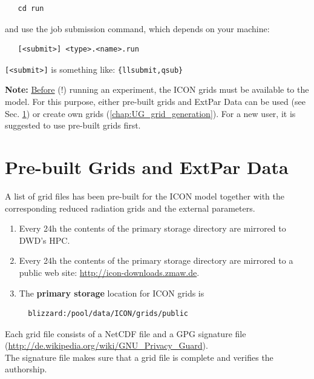 \begin{small}
  \begin{verbatim}
   cd run
  \end{verbatim}
\end{small}

and use the job submission command, which depends on your machine:

\begin{small}
  \begin{verbatim}
   [<submit>] <type>.<name>.run
  \end{verbatim}
\end{small} 

\verb+[<submit>]+ is something like: \verb+{llsubmit,qsub}+

\textbf{Note:} \underline{Before} (!) running an experiment, the ICON grids must be available to the model. For this purpose, either pre-built grids and ExtPar Data can be used (see Sec. \ref{chap:prebuilt_grid}) or create own grids (\ref{chap:UG_grid_generation}). For a new user, it is suggested to use pre-built grids first.

\section{Pre-built Grids and ExtPar Data}\label{chap:prebuilt_grid}
A list of grid files has been pre-built for the ICON model together with the corresponding reduced radiation grids and the external parameters.

\begin{enumerate}

\item Every 24h the contents of the primary storage directory are mirrored to DWD's HPC.
\item Every 24h the contents of the primary storage directory are mirrored to a public web site:
\href{http://icon-downloads.zmaw.de}{http://icon-downloads.zmaw.de}.
\item The \textbf{primary storage} location for ICON grids is
\begin{small}
 \begin{verbatim}
  blizzard:/pool/data/ICON/grids/public 
 \end{verbatim}
\end{small}
\end{enumerate}

Each grid file consists of a NetCDF file and a GPG signature file\\ 
(\href{http://de.wikipedia.org/wiki/GNU\_Privacy\_Guard}{http://de.wikipedia.org/wiki/GNU\_Privacy\_Guard}).\\ 
The signature file makes sure that a grid file is complete and verifies the authorship.

